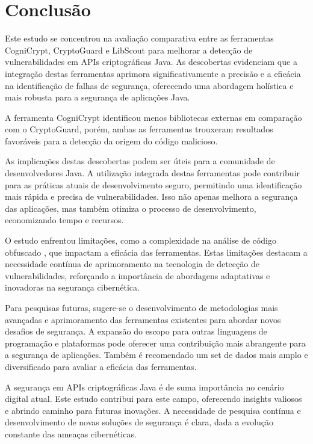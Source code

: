\section{Conclusão}

Este estudo se concentrou na avaliação comparativa entre as ferramentas CogniCrypt, CryptoGuard e LibScout para melhorar a detecção de vulnerabilidades em APIs criptográficas Java. As descobertas evidenciam que a integração destas ferramentas aprimora significativamente a precisão e a eficácia na identificação de falhas de segurança, oferecendo uma abordagem holística e mais robusta para a segurança de aplicações Java.

A ferramenta CogniCrypt identificou menos bibliotecas externas em comparação com o CryptoGuard, porém, ambas as ferramentas trouxeram resultados favoráveis para a detecção da origem do código malicioso. 

As implicações destas descobertas podem ser úteis para a comunidade de desenvolvedores Java. A utilização integrada destas ferramentas pode contribuir para as práticas atuais de desenvolvimento seguro, permitindo uma identificação mais rápida e precisa de vulnerabilidades. Isso não apenas melhora a segurança das aplicações, mas também otimiza o processo de desenvolvimento, economizando tempo e recursos. \cite{perception_developers}

O estudo enfrentou limitações, como a complexidade na análise de código obfuscado \cite{api_misuses_zhang}, que impactam a eficácia das ferramentas. Estas limitações destacam a necessidade contínua de aprimoramento na tecnologia de detecção de vulnerabilidades, reforçando a importância de abordagens adaptativas e inovadoras na segurança cibernética.

Para pesquisas futuras, sugere-se o desenvolvimento de metodologias mais avançadas e aprimoramento das ferramentas existentes para abordar novos desafios de segurança. A expansão do escopo para outras linguagens de programação e plataformas pode oferecer uma contribuição mais abrangente para a segurança de aplicações. Também é recomendado um set de dados mais amplo e diversificado para avaliar a eficácia das ferramentas.

A segurança em APIs criptográficas Java é de suma importância no cenário digital atual. Este estudo contribui para este campo, oferecendo insights valiosos e abrindo caminho para futuras inovações. A necessidade de pesquisa contínua e desenvolvimento de novas soluções de segurança é clara, dada a evolução constante das ameaças cibernéticas.
